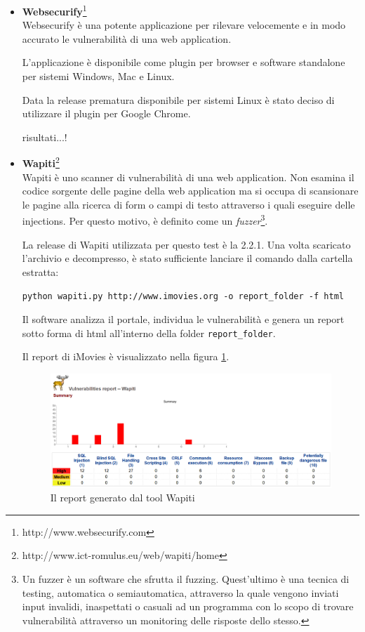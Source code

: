 \documentclass{article}
\begin{document}
\begin{itemize}
\item \textbf{Websecurify}\footnote{http://www.websecurify.com}\\
Websecurify è una potente applicazione per rilevare velocemente e in modo accurato le vulnerabilità di una web application.

L'applicazione è disponibile come plugin per browser e software standalone per sistemi Windows, Mac e Linux.

Data la release prematura disponibile per sistemi Linux è stato deciso di utilizzare il plugin per Google Chrome.

risultati...!

\item \textbf{Wapiti}\footnote{http://www.ict-romulus.eu/web/wapiti/home}\\
Wapiti è uno scanner di vulnerabilità di una web application.
Non esamina il codice sorgente delle pagine della web application ma si occupa di scansionare le pagine alla ricerca di form o campi di testo attraverso i quali eseguire delle injections. Per questo motivo, è definito come un \emph{fuzzer}\footnote{Un fuzzer è un software che sfrutta il fuzzing. Quest'ultimo è una tecnica di testing, automatica o semiautomatica, attraverso la quale vengono inviati input invalidi, inaspettati o casuali ad un programma con lo scopo di trovare vulnerabilità attraverso un monitoring delle risposte dello stesso.}.

La release di Wapiti utilizzata per questo test è la 2.2.1.
Una volta scaricato l'archivio e decompresso, è stato sufficiente lanciare il comando dalla cartella estratta:
\begin{center}
\small
{\tt python wapiti.py http://www.imovies.org -o report\_folder -f html}
\end{center}

Il software analizza il portale, individua le vulnerabilità e genera un report sotto forma di html all'interno della folder {\tt report\_folder}.

Il report di iMovies è visualizzato nella figura \ref{wapiti}.
\begin{figure}[h!]\label{wapiti}
\centering
\includegraphics[width=\textwidth]{img/wapiti}
\caption{Il report generato dal tool Wapiti}
\end{figure}


\end{itemize}
\end{document}
